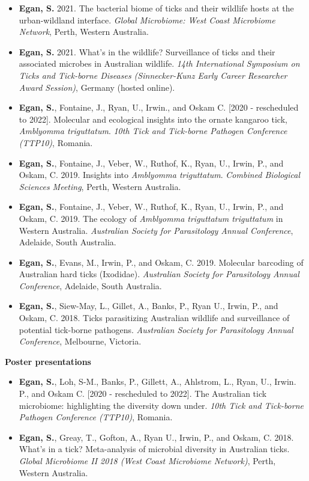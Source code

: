 \documentclass[a4paper, nobind]{templates/ociamthesis}
\providecommand{\tightlist}{%
  \setlength{\itemsep}{0pt}\setlength{\parskip}{0pt}}
\begin{document}
\begin{itemize}
\tightlist
\item
  \textbf{Egan, S.} 2021. The bacterial biome of ticks and their wildlife hosts at the urban-wildland interface. \emph{Global Microbiome: West Coast Microbiome Network}, Perth, Western Australia.
\item
  \textbf{Egan, S.} 2021. What's in the wildlife? Surveillance of ticks and their associated microbes in Australian wildlife. \emph{14th International Symposium on Ticks and Tick-borne Diseases (Sinnecker-Kunz Early Career Researcher Award Session)}, Germany (hosted online).
\item
  \textbf{Egan, S.}, Fontaine, J., Ryan, U., Irwin., and Oskam C. {[}2020 - rescheduled to 2022{]}. Molecular and ecological insights into the ornate kangaroo tick, \emph{Amblyomma triguttatum}. \emph{10th Tick and Tick-borne Pathogen Conference (TTP10)}, Romania.
\item
  \textbf{Egan, S.}, Fontaine, J., Veber, W., Ruthof, K., Ryan, U., Irwin, P., and Oskam, C. 2019. Insights into \emph{Amblyomma triguttatum}. \emph{Combined Biological Sciences Meeting}, Perth, Western Australia.
\item
  \textbf{Egan, S.}, Fontaine, J., Veber, W., Ruthof, K., Ryan, U., Irwin, P., and Oskam, C. 2019. The ecology of \emph{Amblyomma triguttatum triguttatum} in Western Australia. \emph{Australian Society for Parasitology Annual Conference}, Adelaide, South Australia.
\item
  \textbf{Egan, S.}, Evans, M., Irwin, P., and Oskam, C. 2019. Molecular barcoding of Australian hard ticks (Ixodidae). \emph{Australian Society for Parasitology Annual Conference}, Adelaide, South Australia.
\item
  \textbf{Egan, S.}, Siew-May, L., Gillet, A., Banks, P., Ryan U., Irwin, P., and Oskam, C. 2018. Ticks parasitizing Australian wildlife and surveillance of potential tick-borne pathogens. \emph{Australian Society for Parasitology Annual Conference}, Melbourne, Victoria.
\end{itemize}

\textbf{Poster presentations}

\begin{itemize}
\tightlist
\item
  \textbf{Egan, S.}, Loh, S-M., Banks, P., Gillett, A., Ahlstrom, L., Ryan, U., Irwin. P., and Oskam C. {[}2020 - rescheduled to 2022{]}. The Australian tick microbiome: highlighting the diversity down under. \emph{10th Tick and Tick-borne Pathogen Conference (TTP10)}, Romania.
\item
  \textbf{Egan, S.}, Greay, T., Gofton, A., Ryan U., Irwin, P., and Oskam, C. 2018. What's in a tick? Meta-analysis of microbial diversity in Australian ticks. \emph{Global Microbiome II 2018 (West Coast Microbiome Network)}, Perth, Western Australia.
\end{itemize}
\end{document}
